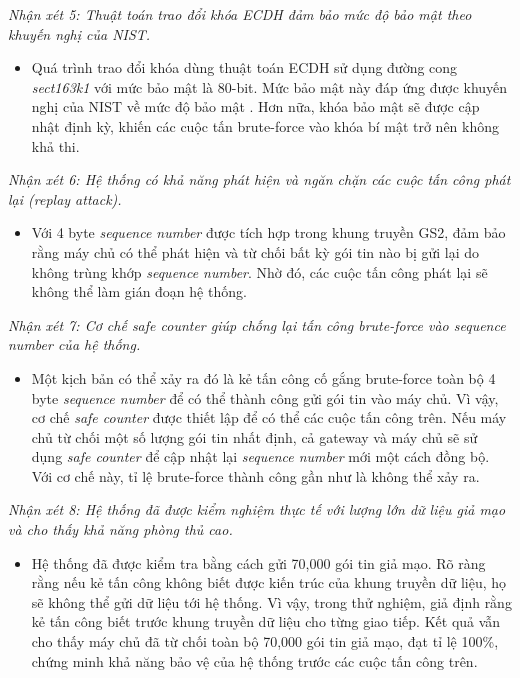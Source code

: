 \textit{Nhận xét 5: Thuật toán trao đổi khóa ECDH đảm bảo mức độ bảo mật theo khuyến nghị của NIST.}
\begin{itemize}
    \item Quá trình trao đổi khóa dùng thuật toán ECDH sử dụng đường cong \textit{sect163k1} với mức bảo mật là 80-bit. Mức bảo mật này đáp ứng được khuyến nghị của NIST về mức độ bảo mật \cite{?}. Hơn nữa, khóa bảo mật sẽ được cập nhật định kỳ, khiến các cuộc tấn brute-force vào khóa bí mật trở nên không khả thi.
\end{itemize}

\textit{Nhận xét 6: Hệ thống có khả năng phát hiện và ngăn chặn các cuộc tấn công phát lại (replay attack).}
\begin{itemize}
    \item Với 4 byte \textit{sequence number} được tích hợp trong khung truyền GS2, đảm bảo rằng máy chủ có thể phát hiện và từ chối bất kỳ gói tin nào bị gửi lại do không trùng khớp \textit{sequence number}. Nhờ đó, các cuộc tấn công phát lại sẽ không thể làm gián đoạn hệ thống.
\end{itemize}

\textit{Nhận xét 7: Cơ chế safe counter giúp chống lại tấn công brute-force vào sequence number của hệ thống.}
\begin{itemize}
    \item Một kịch bản có thể xảy ra đó là kẻ tấn công cố gắng brute-force toàn bộ 4 byte \textit{sequence number} để có thể thành công gửi gói tin vào máy chủ. Vì vậy, cơ chế \textit{safe counter} được thiết lập để có thể các cuộc tấn công trên. Nếu máy chủ từ chối một số lượng gói tin nhất định, cả gateway và máy chủ sẽ sử dụng \textit{safe counter} để cập nhật lại \textit{sequence number} mới một cách đồng bộ. Với cơ chế này, tỉ lệ brute-force thành công gần như là không thể xảy ra. 
\end{itemize}

\textit{Nhận xét 8: Hệ thống đã được kiểm nghiệm thực tế với lượng lớn dữ liệu giả mạo và cho thấy khả năng phòng thủ cao.}
\begin{itemize}
    \item Hệ thống đã được kiểm tra bằng cách gửi 70,000 gói tin giả mạo. Rõ ràng rằng nếu kẻ tấn công không biết được kiến trúc của khung truyền dữ liệu, họ sẽ không thể gửi dữ liệu tới hệ thống. Vì vậy, trong thử nghiệm, giả định rằng kẻ tấn công biết trước khung truyền dữ liệu cho từng giao tiếp. Kết quả vẫn cho thấy máy chủ đã từ chối toàn bộ 70,000 gói tin giả mạo, đạt tỉ lệ 100\%, chứng minh khả năng bảo vệ của hệ thống trước các cuộc tấn công trên.
\end{itemize}

